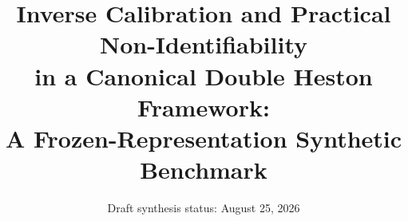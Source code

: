 \documentclass[11pt]{article}
\title{Inverse Calibration and Practical Non-Identifiability\\
in a Canonical Double Heston Framework:\\
A Frozen-Representation Synthetic Benchmark}
\author{\placeholder{Author list}}
\date{Draft synthesis status: August 25, 2026}
\begin{document}
\maketitle

\begin{abstract}

\end{abstract}

















\appendix

\end{document}
